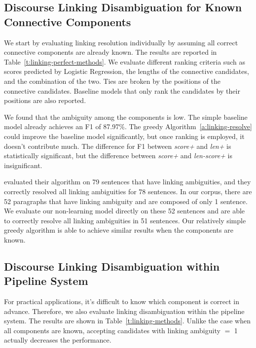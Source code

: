 \subsection{Discourse Linking Disambiguation for Known Connective Components}

We start by evaluating linking resolution individually by assuming all correct
connective components are already known. The results are reported in
Table~\ref{t:linking-perfect-methods}.
We evaluate different ranking criteria such as scores predicted by
Logistic Regression, the lengths of the connective candidates, and the combination
of the two. Ties are broken by the positions of the connective candidates.
Baseline models that only rank the candidates by their positions are also reported.

We found that the ambiguity among the components is low. The simple
baseline model already achieves an F1 of 87.97\%. The greedy
Algorithm~\ref{a:linking-resolve} could improve the baseline
model significantly, but once ranking is employed, it doesn't contribute much.
The difference for F1 between \textit{score+} and \textit{len+} is statistically
significant, but the difference between \textit{score+} and \textit{len-score+}
is insignificant.




\cite{hu2011research} evaluated their algorithm on 79 sentences that have
linking ambiguities, and they correctly resolved all linking ambiguities for 78
sentences. In our corpus, there are 52 paragraphs that have linking ambiguity
and are composed of only 1 sentence. We evaluate our non-learning  model
directly on these 52 sentences and are able to correctly resolve all linking
ambiguities in 51 sentences. Our relatively simple greedy algorithm is
able to achieve similar results when the components are known.

\subsection{Discourse Linking Disambiguation within Pipeline System}

For practical applications, it's difficult to know which component is correct in
advance. Therefore, we also evaluate linking disambiguation within the pipeline
system. The results are shown in Table~\ref{t:linking-methods}. Unlike the case
when all components are known, accepting candidates with linking ambiguity $=$ 1 actually
decreases the performance.

